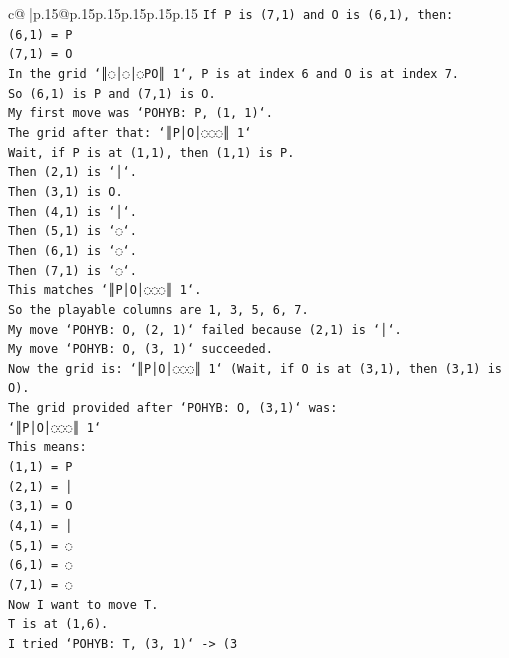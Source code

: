 \documentclass{article}
\begin{document}
{\begin{supertabular}{c@{$\;$}|p{.15\linewidth}@{}p{.15\linewidth}p{.15\linewidth}p{.15\linewidth}p{.15\linewidth}p{.15\linewidth}}
{{{\texttt{If P is (7,1) and O is (6,1), then:} \\
\texttt{(6,1) = P} \\
\texttt{(7,1) = O} \\
\texttt{In the grid `║◌│◌│◌PO║ 1`, P is at index 6 and O is at index 7.} \\
\texttt{So (6,1) is P and (7,1) is O.} \\
\texttt{My first move was `POHYB: P, (1, 1)`.} \\
\texttt{The grid after that: `║P│O│◌◌◌║ 1`} \\
\texttt{Wait, if P is at (1,1), then (1,1) is P.} \\
\texttt{Then (2,1) is `│`.} \\
\texttt{Then (3,1) is O.} \\
\texttt{Then (4,1) is `│`.} \\
\texttt{Then (5,1) is `◌`.} \\
\texttt{Then (6,1) is `◌`.} \\
\texttt{Then (7,1) is `◌`.} \\
\texttt{This matches `║P│O│◌◌◌║ 1`.} \\
\texttt{So the playable columns are 1, 3, 5, 6, 7.} \\
\texttt{My move `POHYB: O, (2, 1)` failed because (2,1) is `│`.} \\
\texttt{My move `POHYB: O, (3, 1)` succeeded.} \\
\texttt{Now the grid is: `║P│O│◌◌◌║ 1` (Wait, if O is at (3,1), then (3,1) is O).} \\
\texttt{The grid provided after `POHYB: O, (3,1)` was:} \\
\texttt{`║P│O│◌◌◌║ 1`} \\
\texttt{This means:} \\
\texttt{(1,1) = P} \\
\texttt{(2,1) = │} \\
\texttt{(3,1) = O} \\
\texttt{(4,1) = │} \\
\texttt{(5,1) = ◌} \\
\texttt{(6,1) = ◌} \\
\texttt{(7,1) = ◌} \\
\texttt{Now I want to move T.} \\
\texttt{T is at (1,6).} \\
\texttt{I tried `POHYB: T, (3, 1)` {-}> (3} \\
            }
        }
    }
     \\ \\


\end{supertabular}}
\end{document}
